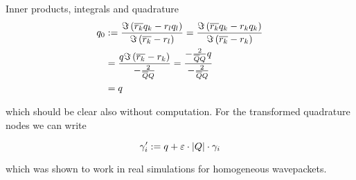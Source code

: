 \begin{chapter}{Inner products, integrals and quadrature}
\begin{equation}
\begin{split}
  q_0 & := \frac{\Im \left(\overline{r_k}q_k-r_l q_l\right)}{\Im \left(\overline{r_k}-r_l\right)}
        = \frac{\Im \left(\overline{r_k}q_k-r_k q_k\right)}{\Im \left(\overline{r_k}-r_k\right)} \\
      & = \frac{q \Im \left(\overline{r_k}-r_k\right)}{-\frac{2}{\overline{Q}Q}}
        = \frac{-\frac{2}{\overline{Q}Q}q}{-\frac{2}{\overline{Q}Q}} \\
      & = q
\end{split}
\end{equation}

which should be clear also without computation. For the transformed quadrature
nodes we can write

\begin{equation}
  \gamma^{\prime}_i := q + \varepsilon \cdot |Q| \cdot \gamma_i
\end{equation}

which was shown to work in real simulations for homogeneous wavepackets.



\end{chapter}
